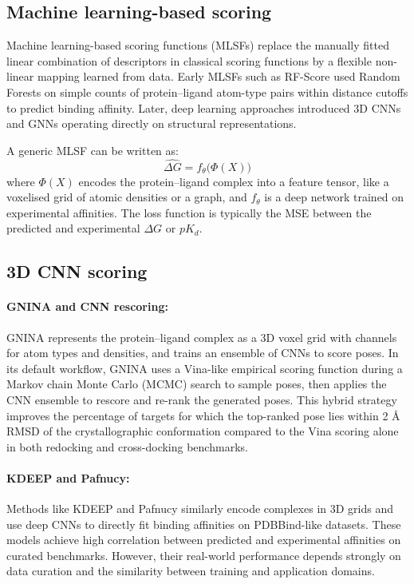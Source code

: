 \documentclass[12pt]{article}
\begin{document}
\subsection{Machine learning-based scoring}

Machine learning-based scoring functions (MLSFs) replace the manually fitted linear combination of descriptors in classical scoring functions by a flexible non-linear mapping learned from data\cite{CH13_meli2022dlreview}. Early MLSFs such as RF-Score used Random Forests on simple counts of protein–ligand atom-type pairs within distance cutoffs to predict binding affinity\cite{CH13_meli2022dlreview,CH13_durant2025robustly}. Later, deep learning approaches introduced 3D CNNs and GNNs operating directly on structural representations.

A generic MLSF can be written as:
\begin{equation}
\hat{\Delta G} = f_{\theta}\big( \Phi(X) \big)
\end{equation}
where $\Phi(X)$ encodes the protein–ligand complex into a feature tensor, like a voxelised grid of atomic densities or a graph, and $f_{\theta}$ is a deep network trained on experimental affinities. The loss function is typically the MSE between the predicted and experimental $\Delta G$ or $pK_d$.

\subsection{3D CNN scoring}

\paragraph{GNINA and CNN rescoring:} GNINA\cite{CH13_mcnutt2021gnina} represents the protein–ligand complex as a 3D voxel grid with channels for atom types and densities, and trains an ensemble of CNNs to score poses. In its default workflow, GNINA uses a Vina-like empirical scoring function during a Markov chain Monte Carlo (MCMC) search to sample poses, then applies the CNN ensemble to rescore and re-rank the generated poses. This hybrid strategy improves the percentage of targets for which the top-ranked pose lies within 2 \r{A} RMSD of the crystallographic conformation compared to the Vina scoring alone in both redocking and cross-docking benchmarks.

\paragraph{KDEEP and Pafnucy:} Methods like KDEEP\cite{CH13_jimenez2018k} and Pafnucy\cite{CH13_stepniewska2018development} similarly encode complexes in 3D grids and use deep CNNs to directly fit binding affinities on PDBBind-like datasets. These models achieve high correlation between predicted and experimental affinities on curated benchmarks. However, their real-world performance depends strongly on data curation and the similarity between training and application domains.
\end{document}
